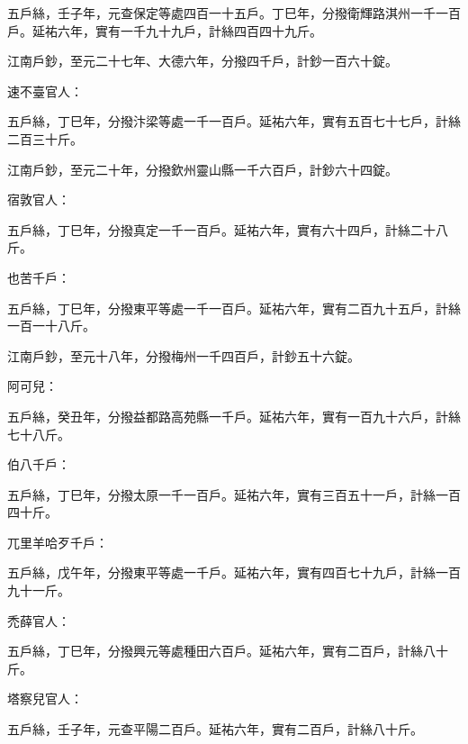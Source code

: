 \begin{pinyinscope}
 五戶絲，壬子年，元查保定等處四百一十五戶。丁巳年，分撥衛輝路淇州一千一百戶。延祐六年，實有一千九十九戶，計絲四百四十九斤。



 江南戶鈔，至元二十七年、大德六年，分撥四千戶，計鈔一百六十錠。



 速不臺官人：



 五戶絲，丁巳年，分撥汴梁等處一千一百戶。延祐六年，實有五百七十七戶，計絲二百三十斤。



 江南戶鈔，至元二十年，分撥欽州靈山縣一千六百戶，計鈔六十四錠。



 宿敦官人：



 五戶絲，丁巳年，分撥真定一千一百戶。延祐六年，實有六十四戶，計絲二十八斤。



 也苦千戶：



 五戶絲，丁巳年，分撥東平等處一千一百戶。延祐六年，實有二百九十五戶，計絲一百一十八斤。



 江南戶鈔，至元十八年，分撥梅州一千四百戶，計鈔五十六錠。



 阿可兒：



 五戶絲，癸丑年，分撥益都路高苑縣一千戶。延祐六年，實有一百九十六戶，計絲七十八斤。



 伯八千戶：



 五戶絲，丁巳年，分撥太原一千一百戶。延祐六年，實有三百五十一戶，計絲一百四十斤。



 兀里羊哈歹千戶：



 五戶絲，戊午年，分撥東平等處一千戶。延祐六年，實有四百七十九戶，計絲一百九十一斤。



 禿薛官人：



 五戶絲，丁巳年，分撥興元等處種田六百戶。延祐六年，實有二百戶，計絲八十斤。



 塔察兒官人：



 五戶絲，壬子年，元查平陽二百戶。延祐六年，實有二百戶，計絲八十斤。




\end{pinyinscope}
